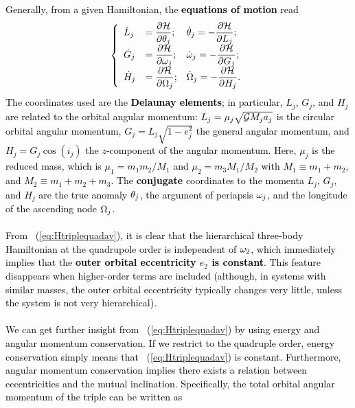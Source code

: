 \documentclass[main.tex]{subfiles}
\begin{document}
\begin{tcolorbox}[sharp corners, colback=green!30, colframe=green!80!blue, title=Box \ref{boxchap3:dynVI} -- Orbital dynamics VI (continued)]
\par \textcolor{black}{
Generally, from a given Hamiltonian, the {\bf equations of motion} read
\begin{align}
\label{eq:Hameq}
\left \{ \begin{array}{lll}
\displaystyle \dot{L}_j &= \displaystyle \frac{\partial \mathcal{H}}{\partial \theta_j}; & \dot{\theta}_j = \displaystyle - \frac{\partial \mathcal{H}}{\partial L_j}; \\
\displaystyle \dot{G}_j &= \displaystyle \frac{\partial \mathcal{H}}{\partial \omega_j}; & \dot{\omega}_j = \displaystyle - \frac{\partial \mathcal{H}}{\partial G_j}; \\
\displaystyle \dot{H}_j &= \displaystyle \frac{\partial \mathcal{H}}{\partial \Omega_j}; & \dot{\Omega}_j = \displaystyle - \frac{\partial \mathcal{H}}{\partial H_j}. \\
\end{array} \right.
\end{align}
The coordinates used are the {\bf Delaunay elements}; in particular, $L_j$, $G_j$, and $H_j$ are related to the orbital angular momentum: $L_j = \mu_j \sqrt{\mathcal{G} M_j a_j}$ is the circular orbital angular momentum, $G_j = L_j \sqrt{1-e_j^2}$ the general angular momentum, and $H_j = G_j \cos (i_j)$ the $z$-component of the angular momentum. Here, $\mu_j$ is the reduced mass, which is $\mu_1 = m_1m_2/M_1$ and $\mu_2 = m_3 M_1/M_2$ with $M_1 \equiv m_1+m_2$, and $M_2 \equiv m_1+m_2+m_3$. The {\bf conjugate} coordinates to the momenta $L_j$, $G_j$, and $H_j$ are the true anomaly $\theta_j$, the argument of periapsis $\omega_j$, and the longitude of the ascending node $\Omega_j$. \\ \\
From \Eq~(\ref{eq:Htriplequadav}), it is clear that the hierarchical three-body Hamiltonian at the quadrupole order is independent of $\omega_2$, which immediately implies that the {\bf outer orbital eccentricity $e_2$ is constant}. This feature disappears when higher-order terms are included (although, in systems with similar masses, the outer orbital eccentricity typically changes very little, unless the system is not very hierarchical). \\ \\
We can get further insight from \Eq~(\ref{eq:Htriplequadav}) by using energy and angular momentum conservation. If we restrict to the quadruple order, energy conservation simply means that \Eq~(\ref{eq:Htriplequadav}) is constant. Furthermore, angular momentum conservation implies there exists a relation between eccentricities and the mutual inclination. Specifically, the total orbital angular momentum of the triple can be written as
}
\end{tcolorbox}
\end{document}
